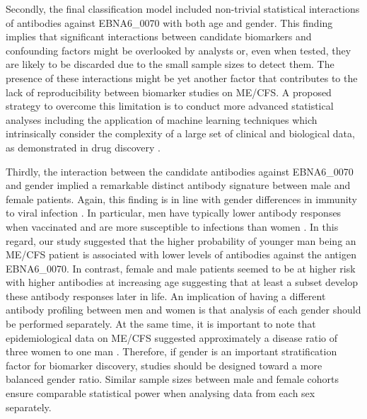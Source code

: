Secondly, the final classification model included non-trivial statistical interactions of antibodies against EBNA6\_0070 with both age and gender. This finding implies that significant interactions between candidate biomarkers and confounding factors might be overlooked by analysts or, even when tested, they are likely to be discarded due to the small sample sizes to detect them. The presence of these interactions might be yet another factor that contributes to the lack of reproducibility between biomarker studies on ME/CFS. A proposed strategy to overcome this limitation is to conduct more advanced statistical analyses including the application of machine learning techniques which intrinsically consider the complexity of a large set of clinical and biological data, as demonstrated in drug discovery \citep{gupta2021ArtificialIntelligence}.%

Thirdly, the interaction between the candidate antibodies against EBNA6\_0070 and gender implied a remarkable distinct antibody signature between male and female patients. Again, this finding is in line with gender differences in immunity to viral infection \citep{jacobsen2021SexDifferences}. In particular, men have typically lower antibody responses when vaccinated and are more susceptible to infections than women \citep{aaby2020NonspecificSexdifferential}. In this regard, our study suggested that the higher probability of younger man being an ME/CFS patient is associated with lower levels of antibodies against the antigen EBNA6\_0070. In contrast, female and male patients seemed to be at higher risk with higher antibodies at increasing age suggesting that at least a subset develop these antibody responses later in life. An implication of having a different antibody profiling between men and women is that analysis of each gender should be performed separately. At the same time, it is important to note that epidemiological data on ME/CFS suggested approximately a disease ratio of three women to one man \citep{nacul2011PrevalenceMyalgic, johnston2016EpidemiologicalCharacteristics, chu2019OnsetPatterns}. Therefore, if gender is an important stratification factor for biomarker discovery, studies should be designed toward a more balanced gender ratio. Similar sample sizes between male and female cohorts ensure comparable statistical power when analysing data from each sex separately.

